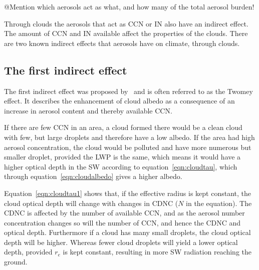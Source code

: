 @Mention which aerosols act as what, and how many of the total aerosol burden!

Through clouds the aerosols that act as CCN or IN also have an indirect effect. The amount of CCN and IN available affect the properties of the clouds. There are two known indirect effects that aerosols have on climate, through clouds.
 
\subsection{The first indirect effect}
The first indirect effect was proposed by~\citet{Twomey1974} and is often referred to as the Twomey effect. It describes the enhancement of cloud albedo as a consequence of an increase in aerosol content and thereby available CCN.

If there are few CCN in an area, a cloud formed there would be a clean cloud with few, but large droplets and therefore have a low albedo. If the area had high aerosol concentration, the cloud would be polluted and have more numerous but smaller droplet, provided the LWP is the same, which means it would have a higher optical depth in the SW according to equation~\ref{eqn:cloudtau}, which through equation~\ref{eqn:cloudalbedo} gives a higher albedo.

Equation~\ref{eqn:cloudtau1} shows that, if the effective radius is kept constant, the cloud optical depth will change with changes in CDNC ($N$ in the equation). The CDNC is affected by the number of available CCN, and as the aerosol number concentration changes so will the number of CCN, and hence the CDNC and optical depth. Furthermore if a cloud has many small droplets, the cloud optical depth will be higher. Whereas fewer cloud droplets will yield a lower optical depth, provided $r_e$ is kept constant, resulting in more SW radiation reaching the ground.

